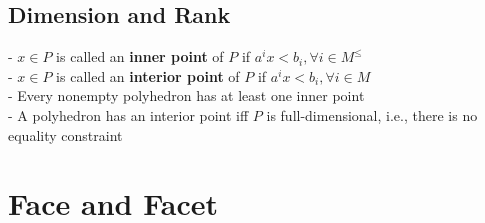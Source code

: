 			\subsection{Dimension and Rank}
				- $x\in P$ is called an \textbf{inner point} of $P$ if $a^ix < b_i, \forall i \in M^\le$\\
				- $x\in P$ is called an \textbf{interior point} of $P$ if $a^ix<b_i, \forall i \in M$\\
				- Every nonempty polyhedron has at least one inner point\\
				- A polyhedron has an interior point iff $P$ is full-dimensional, i.e., there is no equality constraint
		
		\section{Face and Facet}
